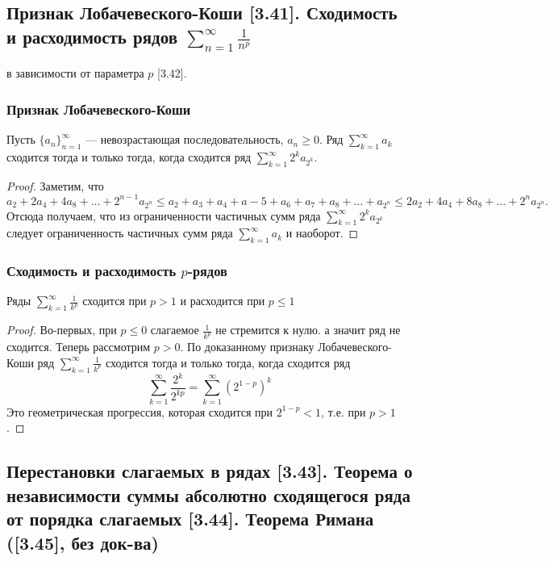 \documentclass[12pt, a4paper]{article}
\begin{document}
    \subsection{Признак Лобачевеского-Коши [3.41]. Сходимость и расходимость рядов $\sum_{n=1}^{\infty} \frac{1}{n^p}$} в зависимости от параметра $p$ [3.42].
    \subsubsection{Признак Лобачевеского-Коши}
    Пусть $\{a_n\}_{n=1}^{\infty}$ --- невозрастающая последовательность, $a_n \geq 0$. Ряд $\sum_{k=1}^{\infty} a_k$ сходится тогда и только тогда, когда сходится ряд $\sum_{k=1}^{\infty} 2^k a_{2^k}$.
    \begin{proof}
    Заметим, что 
    \begin{equation*}
        a_2 + 2 a_4 + 4 a_8 + \dots + 2^{n-1} a_{2^n} \leq a_2 + a_3 + a_4 + a-5 + a_6 + a_7 + a_8 + \dots + a_{2^n} \leq 2 a_2 + 4 a_4 + 8 a_8 + \dots + 2^n a_{2^n}.
    \end{equation*}
    Отсюда получаем, что из ограниченности частичных сумм ряда $\sum_{k=1}^{\infty} 2^k a_{2^k}$ следует ограниченность частичных сумм ряда $\sum_{k=1}^{\infty} a_k$ и наоборот.
    \end{proof}
    \subsubsection{Сходимость и расходимость $p$-рядов}
    Ряды $\sum_{k=1}^{\infty} \frac{1}{k^p}$ сходится при $p > 1$ и расходится при $p \leq 1$
    \begin{proof}
        Во-первых, при $p \leq 0$ слагаемое $\frac{1}{k^p}$ не стремится к нулю. а значит ряд не сходится. Теперь рассмотрим $p > 0$. По доказанному признаку Лобачевеского-Коши ряд $\sum_{k=1}^{\infty} \frac{1}{k^p}$ сходится тогда и только тогда, когда сходится ряд
        \begin{equation*}
            \sum_{k=1}^{\infty} \frac{2^k}{2^{kp}}=\sum_{k=1}^{\infty} (2^{1-p})^k
        \end{equation*}
        Это геометрическая прогрессия, которая сходится при $2^{1-p} < 1$, т.е. при $p > 1$.
    \end{proof}
    \subsection{Перестановки слагаемых в рядах [3.43]. Теорема о независимости суммы абсолютно сходящегося ряда от порядка слагаемых [3.44]. Теорема Римана ([3.45], без док-ва)}
\end{document}
